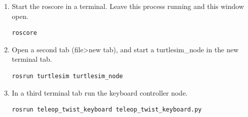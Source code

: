 \documentclass[12pt]{article}
\begin{document}
\begin{description}
\begin{enumerate}
\item Start the roscore in a terminal. Leave this process running and this window open. 	 

\begin{verbatim}
roscore
\end{verbatim}


\item Open a second tab (file>new tab), and start a turtlesim\_node in the new terminal tab.

\begin{verbatim}
rosrun turtlesim turtlesim_node
\end{verbatim}
%
%	

			
\item In a third terminal tab run the keyboard controller node.

\begin{verbatim}
rosrun teleop_twist_keyboard teleop_twist_keyboard.py
\end{verbatim}
			



\end{enumerate}
\end{description}
\end{document}
